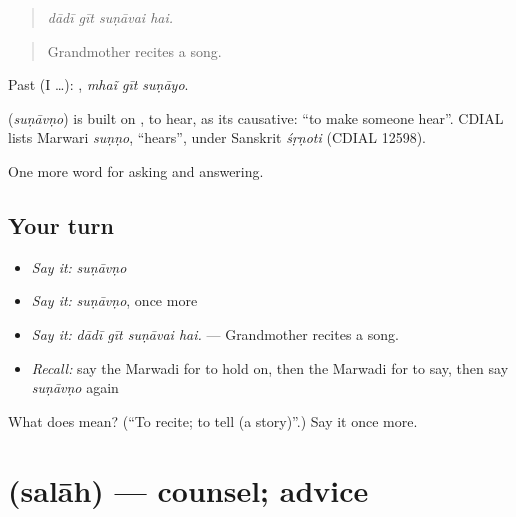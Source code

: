 \begin{quote}
   
\end{quote}

\begin{quote}
\emph{dādī gīt suṇāvai hai.}
\end{quote}

\begin{quote}
Grandmother recites a song.
\end{quote}

Past (I …):   , \emph{mhaĩ gīt suṇāyo}.

\begin{cousinweb}
\textbf{} (\emph{suṇāvṇo}) is built on \textbf{}, to hear, as its causative: \textquotedblleft{}to make someone hear\textquotedblright{}. CDIAL lists Marwari \emph{suṇṇo}, \textquotedblleft{}hears\textquotedblright{}, under Sanskrit \emph{śṛṇoti} (CDIAL 12598).
\end{cousinweb}

\begin{grammarlens}[title={What you've built}]
One more word for asking and answering.
\end{grammarlens}

\subsection*{Your turn}
\begin{itemize}
\raggedright
  \item \emph{Say it:} \emph{suṇāvṇo}
  \item \emph{Say it:} \emph{suṇāvṇo}, once more
  \item \emph{Say it:} \emph{dādī gīt suṇāvai hai.} — Grandmother recites a song.
  \item \emph{Recall:} say the Marwadi for to hold on, then the Marwadi for to say, then say \emph{suṇāvṇo} again
\end{itemize}

\begin{tcolorbox}[breakable,colback=teal!4,colframe=teal!35!black,title={Before you move on}]
What does  mean? (\textquotedblleft{}To recite; to tell (a story)\textquotedblright{}.) Say it once more.
\end{tcolorbox}
\section[\texorpdfstring{\mw{सलाह} (salāh)}{सलाह (salāh)}]{ (salāh) — counsel; advice}

